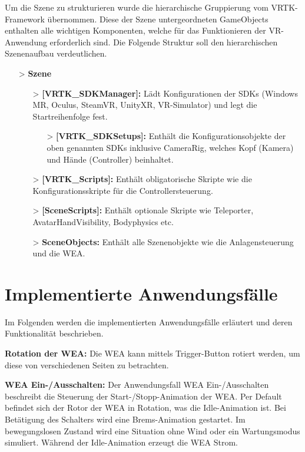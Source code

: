 Um die Szene zu strukturieren wurde die hierarchische Gruppierung vom VRTK-Framework übernommen. Diese der Szene untergeordneten GameObjects enthalten alle wichtigen Komponenten, welche für das Funktionieren der VR-Anwendung erforderlich sind. Die Folgende Struktur soll den hierarchischen Szenenaufbau verdeutlichen.

\begin{itemize}
\item[>] \textbf{Szene} 
	
	\begin{itemize}
	\item[>] \textbf{[VRTK\_SDKManager]:} Lädt Konfigurationen der SDKs (Windows MR, Oculus, SteamVR, UnityXR, VR-Simulator) und legt die Startreihenfolge fest.  	

		\begin{itemize}
			\item[>]\textbf{[VRTK\_SDKSetups]:} Enthält die Konfigurationsobjekte der oben genannten SDKs inklusive CameraRig, welches Kopf (Kamera) und Hände (Controller) beinhaltet.  		
		\end{itemize}
	
	\item[>] \textbf{[VRTK\_Scripts]:} Enthält obligatorische Skripte wie die Konfigurationsskripte für die Controllersteuerung.
					
	\item[>] \textbf{[SceneScripts]:} Enthält optionale Skripte wie Teleporter, AvatarHandVisibility, Bodyphysics etc.
	\item[>] \textbf{SceneObjects:} Enthält alle Szenenobjekte wie die Anlagensteuerung und die WEA.
	\end{itemize}
	
\end{itemize}


\section{Implementierte Anwendungsfälle}
\label{sec:ImplementierteAnwendungsfälle}

Im Folgenden werden die implementierten Anwendungsfälle erläutert und deren Funktionalität beschrieben.

\textbf{Rotation der WEA:} Die WEA kann mittels Trigger-Button rotiert werden, um diese von verschiedenen Seiten zu betrachten. 

\textbf{WEA Ein-/Ausschalten:} Der Anwendungsfall WEA Ein-/Ausschalten beschreibt die Steuerung der Start-/Stopp-Animation der WEA. Per Default befindet sich der Rotor der WEA in Rotation, was die Idle-Animation ist. Bei Betätigung des Schalters wird eine Brems-Animation gestartet. Im bewegungslosen Zustand wird eine Situation ohne Wind oder ein Wartungsmodus simuliert. Während der Idle-Animation erzeugt die WEA Strom.

